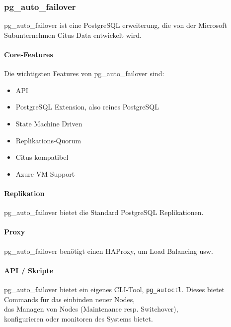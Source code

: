 
\begin{flushleft}
    \subsubsection{pg\_auto\_failover}
    pg\_auto\_failover ist eine PostgreSQL erweiterung, die von der Microsoft Subunternehmen Citus Data entwickelt wird.
\end{flushleft}
\begin{flushleft}
    \paragraph{Core-Features}
    Die wichtigsten Features von pg\_auto\_failover sind:
    \begin{itemize}
        \item API
        \item PostgreSQL Extension, also reines PostgreSQL
        \item State Machine Driven
        \item Replikations-Quorum
        \item Citus kompatibel
        \item Azure VM Support
    \end{itemize}
\end{flushleft}
\begin{flushleft}
    \paragraph{Replikation}
    pg\_auto\_failover bietet die Standard PostgreSQL Replikationen.
\end{flushleft}
\begin{flushleft}
    \paragraph{Proxy}
    pg\_auto\_failover benötigt einen \Gls{HAProxy}, um Load Balancing usw. \cite{VYXTI7BS}
\end{flushleft}
\begin{flushleft}
    \paragraph{API / Skripte}
    pg\_auto\_failover bietet ein eigenes CLI-Tool, \texttt{pg\_autoctl}.
    Dieses bietet Commands für das einbinden neuer Nodes,\\
    das Managen von Nodes (Maintenance resp. Switchover),\\
    konfigurieren oder monitoren des Systems bietet\cite{4X2AKDB6}.
\end{flushleft}

